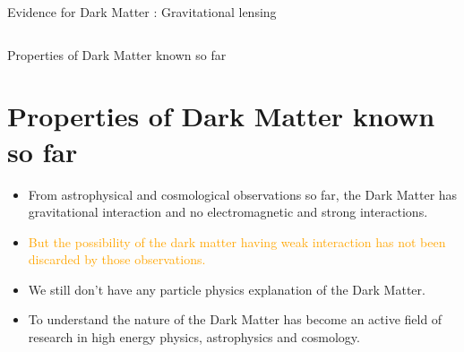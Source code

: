 \documentclass[11pt]{beamer}
\begin{document}
\begin{frame}{Evidence for Dark Matter : Gravitational lensing}
\begin{columns}
\end{columns}
\end{frame}





\begin{frame}{Properties of Dark Matter known so far}

\section{Properties of Dark Matter known so far}

\begin{itemize}


\item From astrophysical and cosmological observations so far, the Dark Matter has gravitational interaction and no electromagnetic and strong interactions.
\vspace{2mm}


\item \textcolor{orange}{But the possibility of the dark matter having weak interaction has not been discarded by those observations.}
\vspace{2mm}
\item We still don't have any particle physics explanation of the Dark Matter.
\vspace{2mm}

\item To understand the nature of the Dark Matter has become an active field of research in high energy physics, astrophysics and cosmology.

\end{itemize}
\end{frame}
\end{document}
